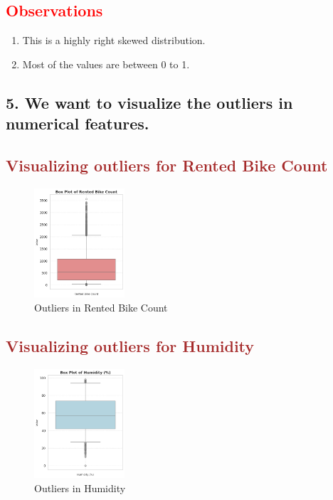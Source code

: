 \documentclass[12pt, letterpaper]{article}
\begin{document}
\subsection*{\textcolor{red}{Observations}}
\begin{enumerate}
  \item This is a highly right skewed distribution.
  \item Most of the values are between 0 to 1.
\end{enumerate}


\subsection*{5. We want to visualize the outliers in numerical features.}

\newpage

\subsection*{\textcolor{brown}{Visualizing outliers for Rented Bike Count}}

\begin{figure}[h]
  \centering
  \includegraphics[width=0.3\textwidth]{bikerented2.png}
  \caption{Outliers in Rented Bike Count}
\end{figure}

\subsection*{\textcolor{brown}{Visualizing outliers for Humidity}}

\begin{figure}[h]
  \centering
  \includegraphics[width=0.3\textwidth]{humanity2.png}
  \caption{Outliers in Humidity}
\end{figure}
\end{document}
